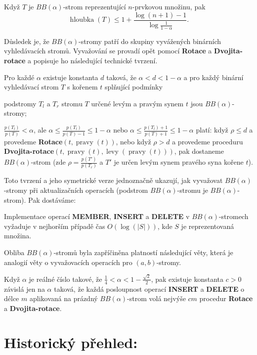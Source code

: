 \documentclass[a4paper,12pt]{article}
\DeclareMathOperator*{\levy}{levy}
\DeclareMathOperator*{\pravy}{pravy}
\DeclareMathOperator*{\hloubka}{hloubka}
\begin{document}
Když $T$ je $BB(\alpha )$-strom reprezentující 
$n$-prvkovou množinu, pak 
$$\hloubka(T)\le 1+\frac {\log(n+1)-1}{\log\frac 1{1-\alpha}}.$$
\endproclaim

Důsledek je, že $BB(\alpha )$-stromy patří do 
skupiny vyvážených binárních vyhledávacích 
stro\-mů.  Vyvažování se provadí opět pomocí 
{\bf Rotace} a {\bf Dvojita-rotace} a popisuje ho následu\-jí\-cí 
technické tvrzení. 

Pro každé $\alpha$ existuje konstanta $
d$ 
taková, že $\alpha <d<1-\alpha$ a pro každý binární vyhledávací 
strom $T$ s kořenem $t$ splňující podmínky
\roster
\item
podstromy $T_l$ a $T_r$ stromu $T$ určené levým a pravým 
synem $t$ jsou $BB(\alpha )$-stromy;
\item
$\frac {p(T_l)}{p(T)}<\alpha$, ale $\alpha\le\frac {
p(T_l)}{p(T)-1}\le 1-\alpha$ nebo $\alpha\le\frac {
p(T_l)+1}{p(T)+1}\le 1-\alpha$
\endroster
platí:\newline 
když $\rho\le d$ a provedeme {\bf Rotace$(t,\pravy(t))$}, nebo když 
$\rho >d$ a provedeme proceduru {\bf Dvojita-rotace$(t,\pravy(t),\levy(\pravy(t)))$}, pak dostaneme 
$BB(\alpha )$-strom (zde $\rho =\frac {p(T')}{p(T_r
)}$ a $T'$ je určen levým synem 
pravé\-ho syna kořene $t$).  
\endproclaim

Toto tvrzení a jeho symetrické verze jednoznačně ukazují, 
jak vyvažovat $BB(\alpha )$-stromy při aktualizačních 
operacích (podstrom $BB(\alpha )$-stromu je $BB(\alpha )$-strom). Pak dostáváme:

Implementace operací {\bf MEMBER}, {\bf INSERT} a {\bf DELETE }v $BB(\alpha )$-stromech vyžaduje v nejhorším 
případě čas $O(\log(|S|))$, kde $S$ je 
reprezentovaná množina.
\endproclaim

Obliba $BB(\alpha )$-stromů byla zapříčiněna 
platností následující věty, která je analogií věty o 
vyvažovacích operacích pro $(a,b)$-stromy.

Když $\alpha$ je reálné číslo takové, že 
$\frac 14<\alpha <1-\frac {\sqrt 2}2$, pak existuje konstanta $c>
0$ závislá jen na 
$\alpha$ taková, že každá posloupnost operací {\bf INSERT} a {\bf DELETE }
o délce $m$ aplikovaná na prázdný $BB(\alpha )$-strom volá 
nejvýše $cm$ procedur {\bf Rotace} a {\bf Dvojita-rotace}.
\endproclaim

\section{Historický přehled:}
\end{document}
